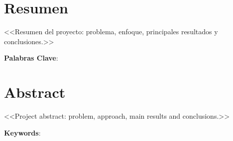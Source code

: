 \chapter*{Resumen} \label{chp:abstract}

<<Resumen del proyecto: problema, enfoque, principales resultados y conclusiones.>>

\textbf{Palabras Clave}: 


\newpage


\chapter*{Abstract}

<<Project abstract: problem, approach, main results and conclusions.>>

\textbf{Keywords}: